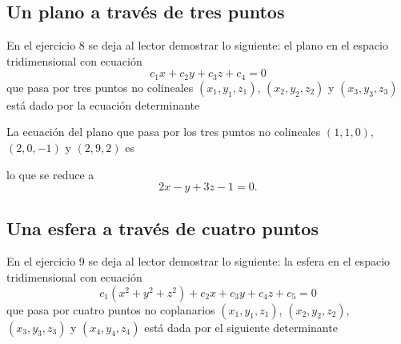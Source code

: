 \newpage

\subsection*{Un plano a través de tres puntos}

En el ejercicio 8 se deja al lector demostrar lo siguiente: el plano en el espacio tridimensional con ecuación
$$c_1x + c_2y + c_3z + c_4 = 0$$
que pasa por tres puntos no colineales $(x_1, y_1, z_1)$, $(x_2, y_2, z_2)$ y $(x_3, y_3, z_3)$ está dado por la ecuación determinante
\begin{matriz}
     \label{plane11}
\end{matriz}

\begin{examplebox}{}{}
    La ecuación del plano que pasa por los tres puntos no colineales $(1, 1, 0)$, $(2, 0, -1)$ y $(2, 9, 2)$ es
    \begin{matrizn}
    \end{matrizn}
    lo que se reduce a
    $$2x - y + 3z - 1 = 0.$$
\end{examplebox}

\subsection*{Una esfera a través de cuatro puntos}

En el ejercicio 9 se deja al lector demostrar lo siguiente: la esfera en el espacio tridimensional con ecuación
$$c_1\left(x^2 + y^2 + z^2\right) + c_2x + c_3y + c_4z + c_5 = 0$$
que pasa por cuatro puntos no coplanarios $(x_1, y_1, z_1)$, $(x_2, y_2, z_2)$, $(x_3, y_3, z_3)$ y $(x_4, y_4, z_4)$ está dada por el siguiente determinante
\begin{matriz}
     \label{esfera12}
\end{matriz}

